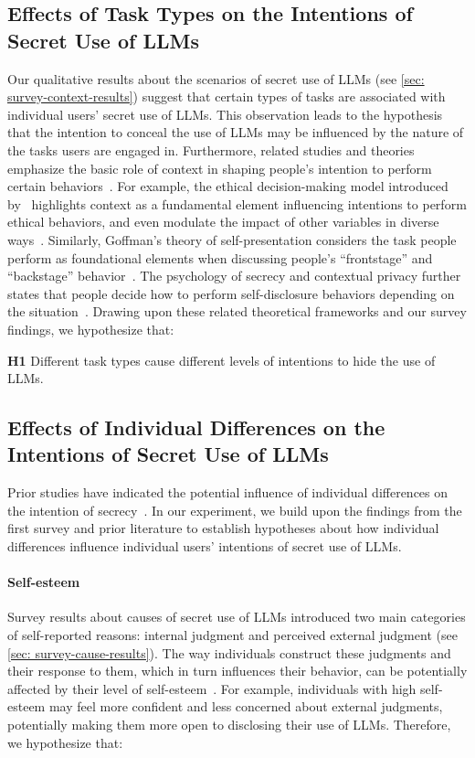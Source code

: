 \subsection{Effects of Task Types on the Intentions of Secret Use of LLMs}
Our qualitative results about the scenarios of secret use of LLMs (see \ref{sec: survey-context-results}) suggest that certain types of tasks are associated with individual users' secret use of LLMs.
This observation leads to the hypothesis that the intention to conceal the use of LLMs may be influenced by the nature of the tasks users are engaged in.
Furthermore, related studies and theories emphasize the basic role of context in shaping people's intention to perform certain behaviors~\cite{bommer1987behavioral, leonard2004influences, kreie2002copyright, hoffman1998women}.
For example, the ethical decision-making model introduced by~\citet{bommer1987behavioral} highlights context as a fundamental element influencing intentions to perform ethical behaviors, and even modulate the impact of other variables in diverse ways~\cite{leonard2004influences, kreie2002copyright, hoffman1998women}.
Similarly, Goffman's theory of self-presentation considers the task people perform as foundational elements when discussing people's ``frontstage'' and ``backstage'' behavior~\cite{goffman2016presentation}.
The psychology of secrecy and contextual privacy further states that people decide how to perform self-disclosure behaviors depending on the situation~\cite{slepian2022process, nissenbaum2004privacy}.
Drawing upon these related theoretical frameworks and our survey findings, we hypothesize that:

\textbf{H1} Different task types cause different levels of intentions to hide the use of LLMs.


\subsection{Effects of Individual Differences on the Intentions of Secret Use of LLMs}
Prior studies have indicated the potential influence of individual differences on the intention of secrecy~\cite{slepian2022process, leonard2004influences}.
In our experiment, we build upon the findings from the first survey and prior literature to establish hypotheses about how individual differences influence individual users' intentions of secret use of LLMs.

\paragraph{Self-esteem}
Survey results about causes of secret use of LLMs introduced two main categories of self-reported reasons: internal judgment and perceived external judgment (see \ref{sec: survey-cause-results}). 
The way individuals construct these judgments and their response to them, which in turn influences their behavior, can be potentially affected by their level of self-esteem~\cite{leary2000nature}. 
For example, individuals with high self-esteem may feel more confident and less concerned about external judgments, potentially making them more open to disclosing their use of LLMs. 
Therefore, we hypothesize that:


